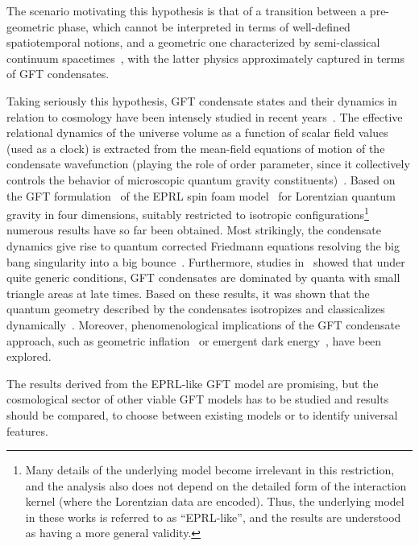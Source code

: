 \documentclass[11pt,a4paper]{article}
\begin{document}
The scenario motivating this hypothesis is that of a transition between a pre-geometric phase, which cannot be interpreted in terms of well-defined spatiotemporal notions, and a geometric one characterized by semi-classical continuum spacetimes~\cite{Oriti:2013jga}, with the latter physics approximately captured in terms of GFT condensates.

Taking seriously this hypothesis, GFT condensate states and their dynamics in relation to cosmology have been intensely studied in recent years~\cite{Gielen:2013kla,Gielen:2013naa,Oriti:2016qtz,Gielen:2016dss,Oriti:2016acw,Pithis:2019tvp}. The effective relational dynamics of the universe volume as a function of scalar field values (used as a clock) is extracted from the mean-field equations of motion of the condensate wavefunction (playing the role of order parameter, since it collectively controls the behavior of microscopic quantum gravity constituents)~\cite{Oriti:2016qtz,Li:2017uao,Gielen:2018fqv}. Based on the GFT formulation~\cite{BenGeloun:2010qkf,Oriti:2016qtz} of the EPRL spin foam model~\cite{Engle:2007wy,Rovelli:2011eq,Perez:2012wv} for Lorentzian quantum gravity in four dimensions, suitably restricted to isotropic configurations\footnote{Many details of the underlying model become irrelevant in this restriction, and the analysis also does not depend on the detailed form of the interaction kernel (where the Lorentzian data are encoded). Thus, the underlying model in these works is referred to as \enquote{EPRL-like}, and the results are understood as having a more general validity.} numerous results have so far been obtained. Most strikingly, the condensate dynamics give rise to quantum corrected Friedmann equations resolving the big bang singularity into a big bounce~\cite{Oriti:2016ueo,Oriti:2016qtz}. Furthermore, studies in~\cite{Gielen:2016uft,Pithis:2016wzf} showed that under quite generic conditions, GFT condensates are dominated by quanta with small triangle areas at late times. Based on these results, it was shown that the quantum geometry described by the condensates isotropizes and classicalizes  dynamically~\cite{Pithis:2016cxg}. Moreover, phenomenological implications of the GFT condensate approach, such as geometric inflation~\cite{deCesare:2016rsf,deCesare:2016axk,Pithis:2016cxg} or emergent dark energy~\cite{Oriti:2021rvm}, have been explored.

The results derived from the EPRL-like GFT model are promising, but the cosmological sector of other viable GFT models has to be studied and results should be compared, to choose between existing models or to identify universal features. 
\end{document}
